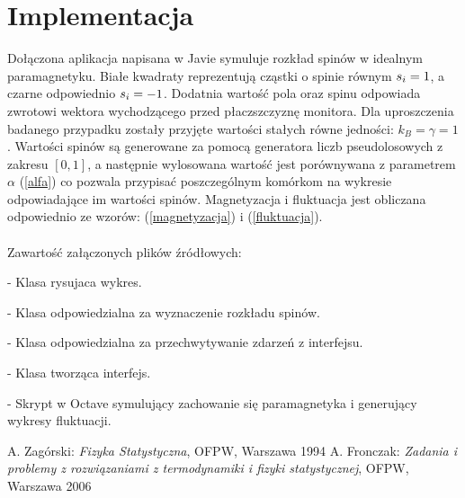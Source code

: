\documentclass[a4paper,10pt]{article}
\begin{document}
	\section{Implementacja}
	Dołączona aplikacja napisana w Javie symuluje rozkład spinów w idealnym paramagnetyku. Białe kwadraty reprezentują cząstki o spinie równym  $s_{i}\nolinebreak=\nolinebreak1$, a czarne odpowiednio $s_{i}\nolinebreak=\nolinebreak-1$. Dodatnia wartość pola oraz spinu odpowiada zwrotowi wektora wychodzącego przed płaczszczyznę monitora. Dla uproszczenia badanego przypadku zostały przyjęte wartości stałych równe jedności: $k_{B}=\gamma=1$. Wartości spinów są generowane za pomocą generatora liczb pseudolosowych z zakresu $[0,1]$, a następnie wylosowana wartość jest porównywana z parametrem $\alpha$ (\ref{alfa}) co pozwala przypisać poszczególnym komórkom na wykresie odpowiadające im wartości spinów. Magnetyzacja i fluktuacja jest obliczana odpowiednio ze wzorów: (\ref{magnetyzacja}) i (\ref{fluktuacja}). \\ \\
	Zawartość załączonych plików źródłowych:\\
		\begin{description}
		\setlength{\itemindent}{0cm}
		\item[Graph.java] - Klasa rysujaca wykres.
		\item[GraphUpdater.java] - Klasa odpowiedzialna za wyznaczenie rozkładu spinów.
		\item[ModificationListener.java] - Klasa odpowiedzialna za przechwytywanie zdarzeń z interfejsu.
		\item[Window.java] - Klasa tworząca interfejs.
		\item[simulation.m] - Skrypt w Octave symulujący zachowanie się paramagnetyka i generujący wykresy fluktuacji.
		\end{description}
		
	\begin{thebibliography}{99}
		 A. Zagórski:
			\emph{Fizyka Statystyczna},
			 OFPW, Warszawa 1994
		 A. Fronczak:
			\emph{Zadania i problemy z rozwiązaniami z termodynamiki i fizyki statystycznej},
			 OFPW, Warszawa 2006
		\end{thebibliography}
	
\end{document}
